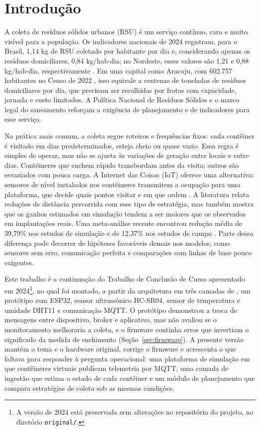 \section{Introdução}\label{sec:introducao}

A coleta de resíduos sólidos urbanos (RSU) é um serviço contínuo, caro e muito
visível para a população. Os indicadores nacionais de 2024 registram, para o
Brasil, 1,14 kg de RSU coletado por habitante por dia e, considerando
apenas os resíduos domiciliares, 0,84 kg/hab$\cdot$dia; no Nordeste,
esses valores são 1,21 e 0,88 kg/hab$\cdot$dia, respectivamente
\cite[p.~25--26]{brasil2025sinisa}. Em uma capital como Aracaju, com
602.757 habitantes no Censo de 2022 \cite{ibge2022censo}, isso equivale a
centenas de toneladas de resíduos domiciliares por dia, que precisam ser
recolhidas por frotas com capacidade, jornada e custo limitados. A Política
Nacional de Resíduos Sólidos \cite{brasil2010lei} e o marco legal do saneamento
\cite{brasil2020lei} reforçam a exigência de planejamento e de indicadores para
esse serviço.

Na prática mais comum, a coleta segue roteiros e frequências fixos: cada
contêiner é visitado em dias predeterminados, esteja cheio ou quase vazio. Essa
regra é simples de operar, mas não se ajusta às variações de geração entre
locais e entre dias. Contêineres que enchem rápido transbordam antes da visita;
outros são esvaziados com pouca carga. A Internet das Coisas (IoT) oferece uma
alternativa: sensores de nível instalados nos contêineres transmitem a ocupação
para uma plataforma, que decide quais pontos visitar e em que ordem
\cite{anagnostopoulos2017challenges,esmaeilian2018future}. A literatura relata
reduções de distância percorrida com esse tipo de estratégia, mas também mostra
que os ganhos estimados em simulação tendem a ser maiores que os observados em
implantações reais. Uma meta-análise recente encontrou redução média de
39,79\% nos estudos de simulação e de 12,37\% nos estudos de campo
\cite{maciel2025impact}. Parte dessa diferença pode decorrer de hipóteses
favoráveis demais nos modelos, como sensores sem erro, comunicação perfeita e
comparações com linhas de base pouco exigentes.

Este trabalho é a continuação do Trabalho de Conclusão de Curso apresentado em
2024\footnote{A versão de 2024 está preservada sem alterações no repositório do
projeto, no diretório \texttt{original/}.}, no qual foi montado, a partir da
arquitetura em três camadas de \cite{oliveira2018arquitetura}, um protótipo com ESP32,
sensor ultrassônico HC-SR04, sensor de temperatura e umidade DHT11 e
comunicação MQTT. O protótipo demonstrou a troca de mensagens entre dispositivo,
broker e aplicativo, mas não avaliou se o monitoramento melhoraria a coleta, e
o firmware continha erros que invertiam o significado da medida de enchimento
(Seção~\ref{sec:firmware}). A presente versão mantém o tema e o hardware
original, corrige o firmware e acrescenta o que faltava para responder à
pergunta operacional: uma plataforma de simulação em que contêineres virtuais
publicam telemetria por MQTT, uma camada de ingestão que estima o estado de cada
contêiner e um módulo de planejamento que compara estratégias de coleta sob as
mesmas condições.


